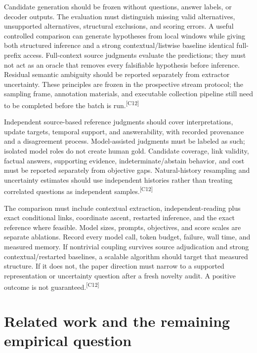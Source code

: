 \documentclass[10pt,letterpaper]{article}
\newcommand{\claim}[1]{\textsuperscript{\scriptsize[#1]}}
\begin{document}
Candidate generation should be frozen without questions, answer labels, or
decoder outputs. The evaluation must distinguish missing valid alternatives,
unsupported alternatives, structural exclusions, and scoring errors. A useful
controlled comparison can generate hypotheses from local windows while giving
both structured inference and a strong contextual/listwise baseline identical
full-prefix access. Full-context source judgments evaluate the predictions;
they must not act as an oracle that removes every falsifiable hypothesis before
inference. Residual semantic ambiguity should be reported separately from
extractor uncertainty. These principles are frozen in the prospective stream
protocol; the sampling frame, annotation materials, and executable collection
pipeline still need to be completed before the batch is run.\claim{C12}

Independent source-based reference judgments should cover interpretations,
update targets, temporal support, and answerability, with recorded provenance
and a disagreement process. Model-assisted judgments must be labeled as such;
isolated model roles do not create human gold. Candidate coverage, link validity,
factual answers, supporting evidence, indeterminate/abstain behavior, and cost
must be reported separately from objective gaps. Natural-history resampling and
uncertainty estimates should use independent histories rather than treating
correlated questions as independent samples.\claim{C12}

The comparison must include contextual extraction, independent-reading plus
exact conditional links, coordinate ascent, restarted inference, and the exact
reference where feasible. Model sizes, prompts, objectives, and score scales
are separate ablations. Record every model call, token budget, failure, wall
time, and measured memory. If nontrivial coupling survives source adjudication
and strong contextual/restarted baselines, a scalable algorithm should target
that measured structure. If it does not, the paper direction must narrow to a
supported representation or uncertainty question after a fresh novelty audit.
A positive outcome is not guaranteed.\claim{C12}

\section{Related work and the remaining empirical question}
\label{sec:relatedwork}
\end{document}
